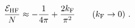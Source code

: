 \begin{equation}
\frac{{\cal E}_{\rm HF}}{N} \approx  -\frac{1}{4\pi}+ \frac{2 k_{\rm F}}{\pi^2} \qquad (k_{\rm F} \to 0) \ . 
\label{t13h}
\end{equation} 
